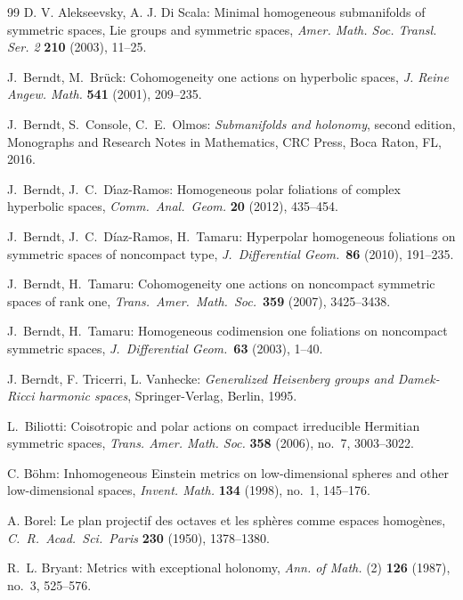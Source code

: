 \documentclass[12pt, a4paper]{amsart}
\theoremstyle{definition}
\begin{document}
\begin{thebibliography}{99}
D. V. Alekseevsky, A. J. Di Scala: Minimal homogeneous submanifolds of symmetric spaces, Lie groups and symmetric spaces, 
\textit{Amer. Math. Soc. Transl. Ser. 2} \textbf{210} (2003), 11–25.

J.~Berndt, M.~Br\"uck:
Cohomogeneity one actions on hyperbolic spaces,
\textit{J. Reine Angew. Math.} {\bf 541} (2001), 209--235.

J.~Berndt, S.~Console, C.~E.~Olmos: {\it Submanifolds and holonomy}, second edition, 
Monographs and Research Notes in Mathematics, CRC Press, Boca Raton, FL, 2016.

J.~Berndt, J.~C.~D\'{\i}az-Ramos: Homogeneous polar foliations of complex hyperbolic spaces, 
\textit{Comm.\ Anal.\ Geom.} \textbf{20} (2012), 435--454.

J.~Berndt, J.~C.~D\'iaz-Ramos, H.~Tamaru: Hyperpolar homogeneous foliations on symmetric spaces of noncompact type, 
\textit{J.~Differential Geom.}\ \textbf{86} (2010), 191--235.

J.~Berndt, H.~Tamaru:
Cohomogeneity one actions on noncompact symmetric spaces of rank one, 
\textit{Trans.\ Amer.\ Math.\ Soc.}\ \textbf{359} (2007), 3425--3438.

J.~Berndt, H.~Tamaru: Homogeneous codimension one foliations on noncompact symmetric spaces,  
\textit{J.~Differential Geom.}\ \textbf{63} (2003), 1--40.

J. Berndt, F. Tricerri, L. Vanhecke: 
\textit{Generalized Heisenberg groups and Damek-Ricci harmonic spaces}, Springer-Verlag, Berlin, 1995. 

L.~Biliotti:
Coisotropic and polar actions on compact irreducible Hermitian symmetric spaces,
\textit{Trans. Amer. Math. Soc.} {\bf 358} (2006), no.~7, 3003--3022.

C. B\"ohm: Inhomogeneous Einstein metrics on low-dimensional spheres and other low-dimensional spaces,
\textit{Invent. Math.} {\bf 134} (1998), no.~1, 145--176.

A. Borel: Le plan projectif des octaves et les sphères comme espaces homogènes, 
\textit{C.\ R.\ Acad.\ Sci.\ Paris} \textbf{230} (1950), 1378--1380.

R.~L. Bryant: Metrics with exceptional holonomy,
\textit{Ann. of Math.} (2) {\bf 126} (1987), no.~3, 525--576.


\end{thebibliography}
\end{document}
